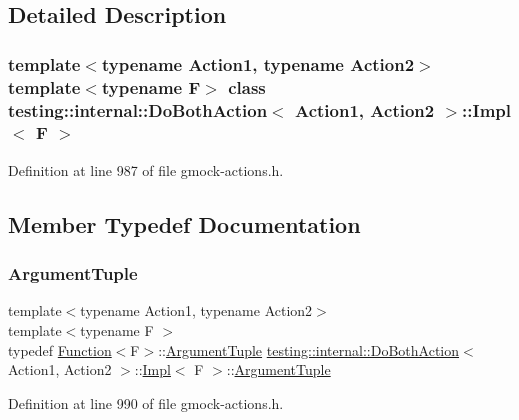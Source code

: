 \subsection{Detailed Description}
\subsubsection*{template$<$typename Action1, typename Action2$>$\newline
template$<$typename F$>$\newline
class testing\+::internal\+::\+Do\+Both\+Action$<$ Action1, Action2 $>$\+::\+Impl$<$ F $>$}



Definition at line 987 of file gmock-\/actions.\+h.



\subsection{Member Typedef Documentation}
\mbox{\label{classtesting_1_1internal_1_1DoBothAction_1_1Impl_a2cd808bf132e28d3df7d59d23c19f273}} 
\subsubsection{\texorpdfstring{Argument\+Tuple}{ArgumentTuple}}
{\footnotesize\ttfamily template$<$typename Action1, typename Action2$>$ \\
template$<$typename F $>$ \\
typedef \hyperlink{structtesting_1_1internal_1_1Function}{Function}$<$F$>$\+::\hyperlink{classtesting_1_1ActionInterface_af72720d864da4d606629e83edc003511}{Argument\+Tuple} \hyperlink{classtesting_1_1internal_1_1DoBothAction}{testing\+::internal\+::\+Do\+Both\+Action}$<$ Action1, Action2 $>$\+::\hyperlink{classtesting_1_1internal_1_1DoBothAction_1_1Impl}{Impl}$<$ F $>$\+::\hyperlink{classtesting_1_1ActionInterface_af72720d864da4d606629e83edc003511}{Argument\+Tuple}}



Definition at line 990 of file gmock-\/actions.\+h.

\mbox{\label{classtesting_1_1internal_1_1DoBothAction_1_1Impl_a90f9878e3c1db37a688b6e0c4c29c17d}} 
